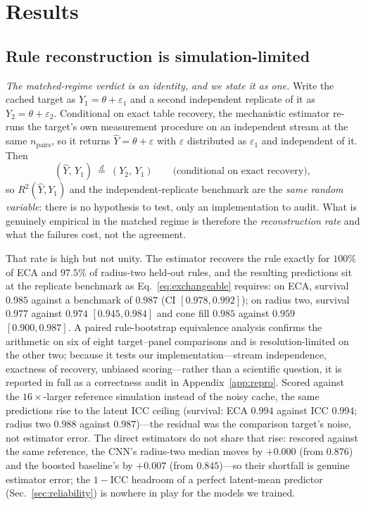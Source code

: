 \documentclass[aip,cha,amsmath,amssymb,reprint,floatfix]{revtex4-2}
\begin{document}
\section{Results}
\label{sec:results}

\subsection{Rule reconstruction is simulation-limited}
\label{sec:results-mech}

\emph{The matched-regime verdict is an identity, and we state it as one.}
Write the cached target as $Y_1=\theta+\varepsilon_1$ and a second independent
replicate of it as $Y_2=\theta+\varepsilon_2$. Conditional on exact table
recovery, the mechanistic estimator re-runs the target's own measurement
procedure on an independent stream at the same $n_{\mathrm{pairs}}$, so it
returns $\hat Y=\theta+\varepsilon$ with $\varepsilon$ distributed as
$\varepsilon_1$ and independent of it. Then
\begin{equation}
(\hat Y,\,Y_1)\ \stackrel{d}{=}\ (Y_2,\,Y_1)
\qquad\text{(conditional on exact recovery)},
\label{eq:exchangeable}
\end{equation}
so $R^2(\hat Y,Y_1)$ and the independent-replicate benchmark are the
\emph{same random variable}: there is no hypothesis to test, only an
implementation to audit. What is genuinely empirical in the matched regime is
therefore the \emph{reconstruction rate} and what the failures cost, not the
agreement.

That rate is high but not unity. The estimator recovers the rule exactly for
$100\%$ of ECA and $97.5\%$ of radius-two held-out rules, and the resulting
predictions sit at the replicate benchmark as Eq.~\eqref{eq:exchangeable}
requires: on ECA, survival $0.985$ against a benchmark of $0.987$ (CI
$[0.978,0.992]$); on radius two, survival $0.977$ against $0.974$
$[0.945,0.984]$ and cone fill $0.985$ against $0.959$ $[0.900,0.987]$. A
paired rule-bootstrap equivalence analysis confirms the arithmetic on six of
eight target--panel comparisons and is resolution-limited on the other two;
because it tests our implementation---stream independence, exactness of
recovery, unbiased scoring---rather than a scientific question, it is reported
in full as a correctness audit in Appendix~\ref{app:repro}. Scored
against the $16\times$-larger reference simulation instead of the noisy cache,
the same predictions rise to the latent ICC ceiling (survival: ECA $0.994$
against ICC $0.994$; radius two $0.988$ against $0.987$)---the residual was
the comparison target's noise, not estimator error. The
direct estimators do not share that rise: rescored against the same reference, the CNN's radius-two median moves by $+0.000$ (from
$0.876$) and the boosted baseline's by $+0.007$ (from $0.845$)---so their
shortfall is genuine estimator error; the $1-\mathrm{ICC}$ headroom of a
perfect latent-mean predictor (Sec.~\ref{sec:reliability}) is nowhere in
play for the models we trained.
\end{document}
